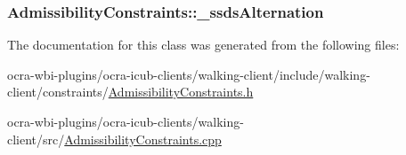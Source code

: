 \hypertarget{classAdmissibilityConstraints_a250631ea82f9c5f88a785537f9e1e9a4}{
\subsubsection[{\-\_\-ssds\-Alternation}]{ {\bf \-Admissibility\-Constraints\-::\-\_\-ssds\-Alternation}}}\label{classAdmissibilityConstraints_a250631ea82f9c5f88a785537f9e1e9a4}


\-The documentation for this class was generated from the following files\-:\begin{DoxyCompactItemize}
\item 
ocra-\/wbi-\/plugins/ocra-\/icub-\/clients/walking-\/client/include/walking-\/client/constraints/\hyperlink{AdmissibilityConstraints_8h}{\-Admissibility\-Constraints.\-h}\item 
ocra-\/wbi-\/plugins/ocra-\/icub-\/clients/walking-\/client/src/\hyperlink{AdmissibilityConstraints_8cpp}{\-Admissibility\-Constraints.\-cpp}\end{DoxyCompactItemize}
